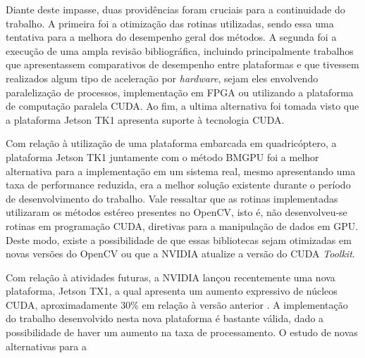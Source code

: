 Diante deste impasse, duas providências foram cruciais para a continuidade do trabalho. A primeira foi a otimização das rotinas utilizadas, sendo essa uma tentativa para a melhora do desempenho geral dos métodos. A segunda foi a execução de uma ampla revisão bibliográfica, incluindo principalmente trabalhos que apresentassem comparativos de desempenho entre plataformas e que tivessem realizados algum tipo de aceleração por \textit{hardware}, sejam eles envolvendo paralelização de processos, implementação em FPGA ou utilizando a plataforma de computação paralela CUDA. Ao fim, a ultima alternativa foi tomada visto que a plataforma Jetson TK1 apresenta suporte à tecnologia CUDA.

Com relação à utilização de uma plataforma embarcada em quadricóptero, a plataforma Jetson TK1 juntamente com o método BMGPU foi a melhor alternativa para a implementação em um sistema real, mesmo apresentando uma taxa de performance reduzida, era a melhor solução existente durante o período de desenvolvimento do trabalho. Vale ressaltar que as rotinas implementadas utilizaram os métodos estéreo presentes no OpenCV, isto é, não desenvolveu-se rotinas em programação CUDA, diretivas para a manipulação de dados em GPU. Deste modo, existe a possibilidade de que essas bibliotecas sejam otimizadas em novas versões do OpenCV ou que a NVIDIA atualize a versão do CUDA \textit{Toolkit}.

Com relação à atividades futuras, a NVIDIA lançou recentemente uma nova plataforma, Jetson TX1, a qual apresenta um aumento expressivo de núcleos CUDA, aproximadamente 30\% em relação à versão anterior \cite{JetsonTX1}. A implementação do trabalho desenvolvido nesta nova plataforma é bastante válida, dado a possibilidade de haver um aumento na taxa de processamento. O estudo de novas alternativas para a 




